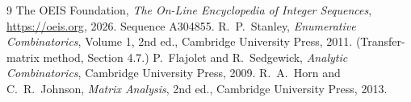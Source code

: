 \documentclass[11pt,a4paper]{article}
\theoremstyle{plain}
\theoremstyle{definition}
\begin{document}
\begin{thebibliography}{9}
 The OEIS Foundation, \emph{The On-Line Encyclopedia of Integer
Sequences}, \url{https://oeis.org}, 2026. Sequence A304855.
 R.~P.~Stanley, \emph{Enumerative Combinatorics}, Volume 1, 2nd ed.,
Cambridge University Press, 2011. (Transfer-matrix method, Section 4.7.)
 P.~Flajolet and R.~Sedgewick, \emph{Analytic Combinatorics}, Cambridge
University Press, 2009.
 R.~A.~Horn and C.~R.~Johnson, \emph{Matrix Analysis}, 2nd ed., Cambridge
University Press, 2013.
\end{thebibliography}
\end{document}
